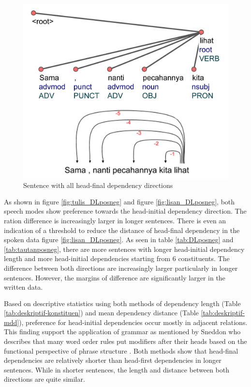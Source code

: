 \documentclass[10pt, a4paper, conference, compsocconf]{IEEEtran}
\begin{document}
\begin{figure}
  \centering
  \includegraphics[width=0.7\linewidth]{pics/ls7375.jpg} 
	\caption{Sentence with all head-final dependency directions}
	\label{fig:ls7375} 
\end{figure}

As shown in figure \ref{fig:tulis_DLposneg} and figure \ref{fig:lisan_DLposneg}, both speech modes show preference towards the head-initial dependency direction. The ration difference is increasingly larger in longer sentences. There is even an indication of a threshold to reduce the distance of head-final dependency in the spoken data figure \ref{fig:lisan_DLposneg}. As seen in table \ref{tab:DLposneg} and \ref{tab:tautanposneg}, there are more sentences with longer head-initial dependency length and more head-initial dependencies starting from 6 constituents. The difference between both directions are increasingly larger particularly in longer sentences. However, the margins of difference are significantly larger in the written data. 

Based on descriptive statistics using both methods of dependency length (Table \ref{tab:deskriptif-konstituen}) and mean dependency distance (Table \ref{tab:deskriptif-mdd}), preference for head-initial dependencies occur mostly in adjacent relations. This finding support the application of grammar as mentioned by Sneddon who describes that many word order rules put modifiers after their heads based on the functional perspective of phrase structure \cite{sneddon2010indonesian}.  Both methods show that head-final dependencies are relatively shorter than head-first dependencies in longer sentences. While in shorter sentences, the length and distance between both directions are quite similar.
\end{document}
